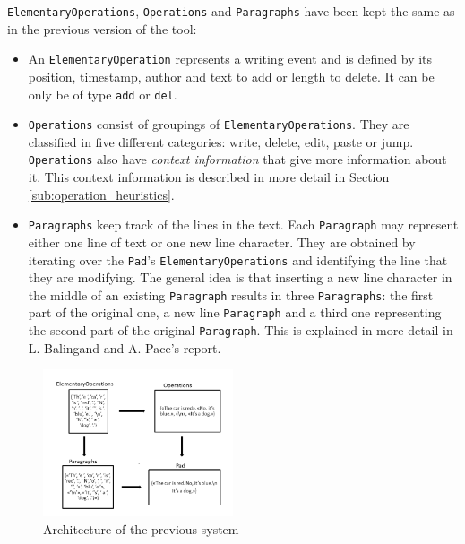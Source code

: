 \documentclass[twocolumn, 12pt]{article}
\begin{document}
  \texttt{ElementaryOperations}, \texttt{Operations} and \texttt{Paragraphs} have been kept the same as in the previous version of the tool:
  \begin{itemize}
    \item An \texttt{ElementaryOperation} represents a writing event and is defined by its position, timestamp, author and text to add or length to delete. It can be only be of type \texttt{add} or \texttt{del}.
    
    \item \texttt{Operations} consist of groupings of \texttt{ElementaryOperations}. They are classified in five different categories: write, delete, edit, paste or jump. \texttt{Operations} also have \textit{context information} that give more information about it. This context information is described in more detail in Section \ref{sub:operation_heuristics}.
    
    \item \texttt{Paragraphs} keep track of the lines in the text. Each \texttt{Paragraph} may represent either one line of text or one new line character. They are obtained by iterating over the \texttt{Pad}'s \texttt{ElementaryOperations} and identifying the line that they are modifying. The general idea is that inserting a new line character in the middle of an existing \texttt{Paragraph} results in three \texttt{Paragraphs}: the first part of the original one, a new line \texttt{Paragraph} and a third one representing the second part of the original \texttt{Paragraph}. This is explained in more detail in L. Balingand and A. Pace's report.
  \end{itemize}
  
      \begin{figure}[bhtp!]
        \centering
        \includegraphics[width=0.5\textwidth]{figures/architecture.png}
        \caption{Architecture of the previous system}
        \label{Architecture}
    \end{figure}
    
\end{document}
